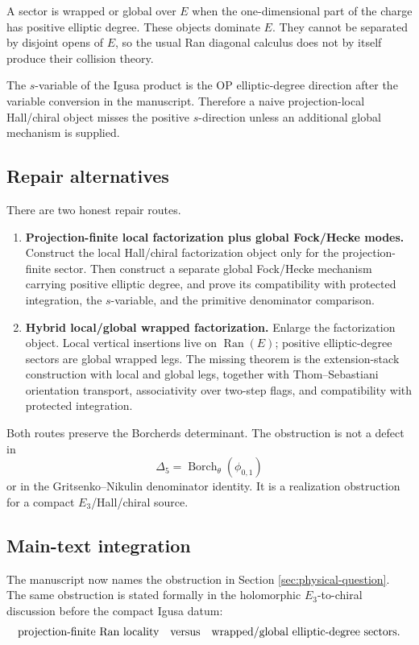 A sector is wrapped or global over \(E\) when the one-dimensional part of
the charge has positive elliptic degree.  These objects dominate \(E\).
They cannot be separated by disjoint opens of \(E\), so the usual Ran
diagonal calculus does not by itself produce their collision theory.

The \(s\)-variable of the Igusa product is the OP elliptic-degree
direction after the variable conversion in the manuscript.  Therefore a
naive projection-local Hall/chiral object misses the positive
\(s\)-direction unless an additional global mechanism is supplied.

\subsection{Repair alternatives}

There are two honest repair routes.

\begin{enumerate}
\item \textbf{Projection-finite local factorization plus global
Fock/Hecke modes.}  Construct the local Hall/chiral factorization object
only for the projection-finite sector.  Then construct a separate global
Fock/Hecke mechanism carrying positive elliptic degree, and prove its
compatibility with protected integration, the \(s\)-variable, and the
primitive denominator comparison.

\item \textbf{Hybrid local/global wrapped factorization.}  Enlarge the
factorization object.  Local vertical insertions live on
\(\operatorname{Ran}(E)\); positive elliptic-degree sectors are global
wrapped legs.  The missing theorem is the extension-stack construction
with local and global legs, together with Thom--Sebastiani orientation
transport, associativity over two-step flags, and compatibility with
protected integration.
\end{enumerate}

Both routes preserve the Borcherds determinant.  The obstruction is not a
defect in
\[
\Delta_5=\operatorname{Borch}_{\theta}(\phi_{0,1})
\]
or in the Gritsenko--Nikulin denominator identity.  It is a realization
obstruction for a compact \(E_3\)/Hall/chiral source.

\subsection{Main-text integration}

The manuscript now names the obstruction in Section
\ref{sec:physical-question}.  The same obstruction is stated formally in
the holomorphic \(E_3\)-to-chiral discussion before the compact Igusa
datum:
\[
\text{projection-finite Ran locality}
\quad\hbox{versus}\quad
\text{wrapped/global elliptic-degree sectors}.
\]

